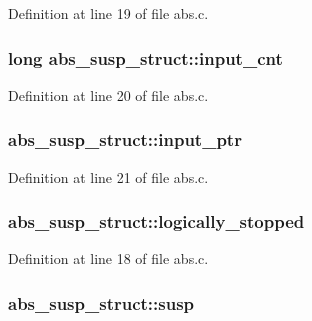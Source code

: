 Definition at line 19 of file abs.\+c.

\subsubsection[{\texorpdfstring{input\+\_\+cnt}{input_cnt}}]{\setlength{\rightskip}{0pt plus 5cm}long abs\+\_\+susp\+\_\+struct\+::input\+\_\+cnt}\hypertarget{structabs__susp__struct_a89f09e1092647dff3969adf328660aec}{}\label{structabs__susp__struct_a89f09e1092647dff3969adf328660aec}


Definition at line 20 of file abs.\+c.

\subsubsection[{\texorpdfstring{input\+\_\+ptr}{input_ptr}}]{ abs\+\_\+susp\+\_\+struct\+::input\+\_\+ptr}\hypertarget{structabs__susp__struct_aac436a4053ee94ebbfd1ddbfe98f8ee9}{}\label{structabs__susp__struct_aac436a4053ee94ebbfd1ddbfe98f8ee9}


Definition at line 21 of file abs.\+c.

\subsubsection[{\texorpdfstring{logically\+\_\+stopped}{logically_stopped}}]{ abs\+\_\+susp\+\_\+struct\+::logically\+\_\+stopped}\hypertarget{structabs__susp__struct_a09153aa9a52315aa16b6caaa47b38072}{}\label{structabs__susp__struct_a09153aa9a52315aa16b6caaa47b38072}


Definition at line 18 of file abs.\+c.

\subsubsection[{\texorpdfstring{susp}{susp}}]{ abs\+\_\+susp\+\_\+struct\+::susp}\hypertarget{structabs__susp__struct_a2a56a687d8eb6ff532540cf82ee5f1dc}{}\label{structabs__susp__struct_a2a56a687d8eb6ff532540cf82ee5f1dc}


